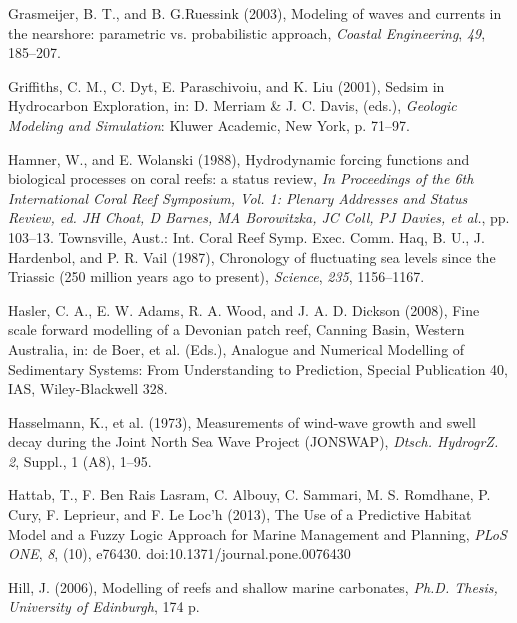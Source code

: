 \documentclass[default,jgrga]{agutex2015}
\begin{document}
\begin{article}
\begin{thebibliography}{}
Grasmeijer, B. T., and B. G.Ruessink (2003), Modeling of waves and currents in the nearshore: parametric vs. probabilistic approach, \textit{Coastal Engineering}, \textit{49}, 185--207.

Griffiths, C. M., C. Dyt, E. Paraschivoiu, and K. Liu (2001), Sedsim in Hydrocarbon Exploration, in: D. Merriam \& J. C. Davis, (eds.), \textit{Geologic Modeling and Simulation}: Kluwer Academic, New York, p. 71--97.

Hamner, W., and E. Wolanski (1988), Hydrodynamic forcing functions and biological processes on coral reefs: a status review, \textit{In Proceedings of the 6th International Coral Reef Symposium, Vol. 1: Plenary Addresses and Status Review, ed. JH Choat, D Barnes, MA Borowitzka, JC Coll, PJ Davies, et al.}, pp. 103--13. Townsville, Aust.: Int. Coral Reef Symp. Exec. Comm.
Haq, B. U., J. Hardenbol, and P. R. Vail (1987), Chronology of fluctuating sea levels since the Triassic (250 million years ago to present), \textit{Science}, \textit{235}, 1156--1167.

Hasler, C. A., E. W. Adams, R. A. Wood, and J. A. D. Dickson (2008), Fine scale forward modelling of a Devonian patch reef, Canning Basin, Western Australia, in: de Boer, et al. (Eds.), Analogue and Numerical Modelling of Sedimentary Systems: From Understanding to Prediction, Special Publication 40, IAS, Wiley-Blackwell 328.

Hasselmann, K., et al. (1973), Measurements of wind-wave growth and swell decay during the Joint North Sea Wave Project (JONSWAP), \textit{Dtsch. HydrogrZ. 2}, Suppl., 1 (A8), 1--95.

Hattab, T., F. Ben Rais Lasram, C. Albouy, C. Sammari, M. S. Romdhane, P. Cury, F. Leprieur, and F. Le Loc'h (2013), The Use of a Predictive Habitat Model and a Fuzzy Logic Approach for Marine Management and Planning, \textit{PLoS ONE}, \textit{8}, (10), e76430. doi:10.1371/journal.pone.0076430

Hill, J. (2006), Modelling of reefs and shallow marine carbonates, \textit{Ph.D. Thesis, University of Edinburgh}, 174 p.


\end{thebibliography}
\end{article}
\end{document}
